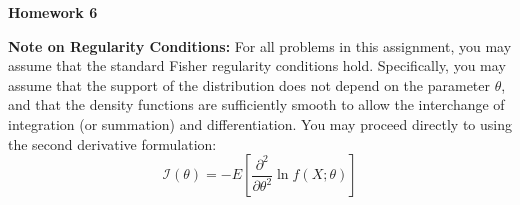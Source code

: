 \documentclass[10pt,twoside]{article}\usepackage[]{graphicx}\usepackage[dvipsnames,svgnames,table]{xcolor}
\begin{document}
\begin{flushright}
\begin{minipage}{.33\textwidth}
\rightline{\today}
\end{minipage}
\end{flushright}

\begin{center}
{\large{\textbf{Homework 6}}}
\end{center}

\noindent\textbf{Note on Regularity Conditions:} For all problems in this assignment, you may assume that the standard Fisher regularity conditions hold.
Specifically, you may assume that the support of the distribution does not depend on the parameter $\theta$, and that the density functions are sufficiently smooth to allow the interchange of integration (or summation) and differentiation.
You may proceed directly to using the second derivative formulation:
$$
\mathcal{I}(\theta) = -E\left[ \frac{\partial^2}{\partial \theta^2} \ln f(X; \theta) \right]
$$
\end{document}
